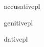 \glsaddkey
{accusativepl}%
{}%
{\glsplentryaccusative}%
{\Glsplentryaccusative}%
{\glsplacc}%
{\Glsplacc}%
{\GLSPLacc}%

\glsaddkey
{genitivepl}%
{}%
{\glsplentrygenitive}%
{\Glsplentrygenitive}%
{\glsplgen}%
{\Glsplgen}%
{\GLSPLgen}%

\glsaddkey
{dativepl}%
{}%
{\glsplentrydative}%
{\Glsplentrydative}%
{\glspldat}%
{\Glspldat}%
{\GLSPLdat}%




